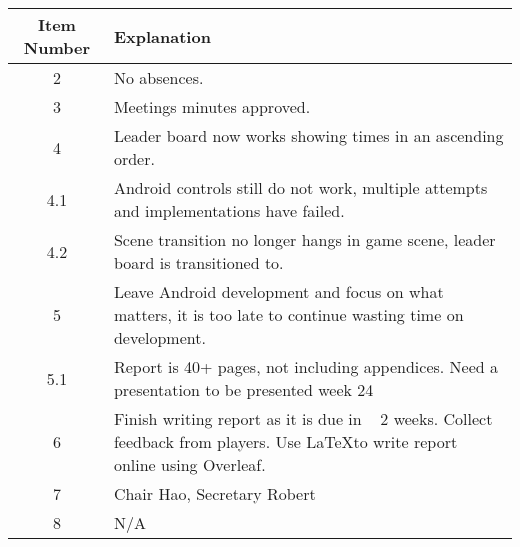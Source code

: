 \documentclass{article}
\begin{document}
\begin{table}[H]
	\centering
	\begin{tabular}{| c | p{9cm} |}
		\hline
		Item Number & Explanation \\ \hline
		2 & No absences.\\ \hline
		3 & Meetings minutes approved. \\ \hline
		4 & Leader board now works showing times in an ascending order.  \\ \hline
		4.1 & Android controls still do not work, multiple attempts and implementations have failed.\\ \hline
		4.2 & Scene transition no longer hangs in game scene, leader board is transitioned to. \\ \hline
		5 &  Leave Android development and focus on what matters, it is too late to continue wasting time on development.\\ \hline
		5.1 & Report is 40+ pages, not including appendices. Need a presentation to be presented week 24 \\ \hline
		6 & Finish writing report as it is due in ~ 2 weeks. Collect feedback from players. Use \LaTeX to write report online using Overleaf. \\ \hline
		7 & Chair Hao, Secretary Robert\\ \hline
		8 & N/A   \\ \hline
		
	\end{tabular}
\end{table}
\end{document}
